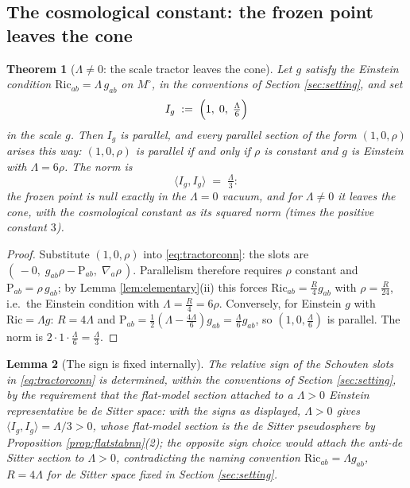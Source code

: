 \documentclass[11pt]{article}
\newtheorem{theorem}{Theorem}[section]
\newtheorem{lemma}[theorem]{Lemma}
\theoremstyle{definition}
\newcommand{\Ric}{\mathrm{Ric}}
\newcommand{\Sch}{\mathrm{P}}
\newcommand{\ip}[2]{\langle #1, #2\rangle}
\begin{document}
\subsection{The cosmological constant: the frozen point leaves the cone}\label{subsec:lambda}

\begin{theorem}[$\Lambda \neq 0$: the scale tractor leaves the cone]\label{thm:lambda}
Let $g$ satisfy the Einstein condition $\Ric_{ab} = \Lambda\, g_{ab}$ on $M^\circ$, in the conventions of Section \ref{sec:setting}, and set
\[
I_g \;:=\; \Bigl(1,\; 0,\; \tfrac{\Lambda}{6}\Bigr)
\]
in the scale $g$. Then $I_g$ is parallel, and every parallel section of the form $(1, 0, \rho)$ arises this way: $(1,0,\rho)$ is parallel if and only if $\rho$ is constant and $g$ is Einstein with $\Lambda = 6\rho$. The norm is
\[
\ip{I_g}{I_g} \;=\; \tfrac{\Lambda}{3} :
\]
the frozen point is null exactly in the $\Lambda = 0$ vacuum, and for $\Lambda \neq 0$ it leaves the cone, with the cosmological constant as its squared norm (times the positive constant $3$).
\end{theorem}

\begin{proof}
Substitute $(1, 0, \rho)$ into \eqref{eq:tractorconn}: the slots are $(\,-0,\; g_{ab}\rho - \Sch_{ab},\; \nabla_a \rho\,)$. Parallelism therefore requires $\rho$ constant and $\Sch_{ab} = \rho\, g_{ab}$; by Lemma \ref{lem:elementary}(ii) this forces $\Ric_{ab} = \tfrac{R}{4}g_{ab}$ with $\rho = \tfrac{R}{24}$, i.e.\ the Einstein condition with $\Lambda = \tfrac{R}{4} = 6\rho$. Conversely, for Einstein $g$ with $\Ric = \Lambda g$: $R = 4\Lambda$ and $\Sch_{ab} = \tfrac12(\Lambda - \tfrac{4\Lambda}{6})g_{ab} = \tfrac{\Lambda}{6}g_{ab}$, so $(1, 0, \tfrac{\Lambda}{6})$ is parallel. The norm is $2 \cdot 1 \cdot \tfrac{\Lambda}{6} = \tfrac{\Lambda}{3}$.
\end{proof}

\begin{lemma}[The sign is fixed internally]\label{lem:signpin}
The relative sign of the Schouten slots in \eqref{eq:tractorconn} is determined, within the conventions of Section \ref{sec:setting}, by the requirement that the flat-model section attached to a $\Lambda > 0$ Einstein representative be de Sitter space: with the signs as displayed, $\Lambda > 0$ gives $\ip{I_g}{I_g} = \Lambda/3 > 0$, whose flat-model section is the de Sitter pseudosphere by Proposition \ref{prop:flatstabnn}(2); the opposite sign choice would attach the anti-de Sitter section to $\Lambda > 0$, contradicting the naming convention $\Ric_{ab} = \Lambda g_{ab}$, $R = 4\Lambda$ for de Sitter space fixed in Section \ref{sec:setting}.
\end{lemma}
\end{document}
